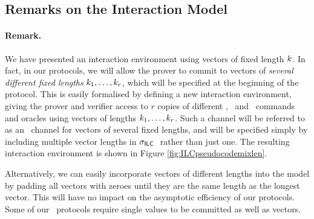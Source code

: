 \subsection{Remarks on the Interaction Model}

\paragraph{Remark.} We have presented an interaction environment using vectors of fixed length $k$. In fact, in our protocols, we will allow the prover to commit to vectors of \emph{several different fixed lengths} $k_1,\ldots,k_r$, which will be specified at the beginning of the protocol. This is easily formalised by defining a new interaction environment, giving the prover and verifier access to $r$ copies of different \ILCcommit, \ILCopen\ and \ILCcheck\ commands and oracles using vectors of lengths $k_1,\ldots,k_r$. Such a channel will be referred to as an \ILC\ channel for vectors of several fixed lengths, and will be specified simply by including multiple vector lengths in $\mathsf{\sigma}_{\mathsf{ILC}~}$ rather than just one. The resulting interaction environment is shown in Figure \ref{fig:ILCpseudocodemixlen}.

Alternatively, we can easily incorporate vectors of different lengths into the model by padding all vectors with zeroes until they are the same length as the longest vector. This will have no impact on the asymptotic efficiency of our protocols. Some of our \ILC\ protocols require single values to be committed as well as vectors. 

